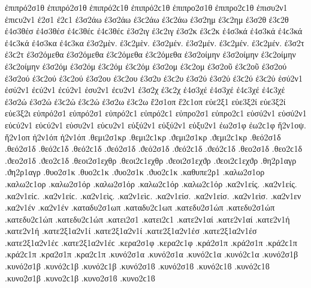 {ἐπιπρό2σ1θ ἐπιπρό2σ1θ ἐπιπρό2ϲ1θ ἐπιπρό2ϲ1θ   %
ἐπιπρο2σ1θ ἐπιπρο2ϲ1θ
ἐπισυ2ν1 ἐπιϲυ2ν1   %
ἐ2σ1 ἐ2ϲ1
ἐ3σ2άω ἐ3σ2άω ἐ3ϲ2άω ἐ3ϲ2άω   %
ἐ3σ2ημ ἐ3ϲ2ημ   %
ἐ3σ2θ ἐ3ϲ2θ   %
ἐ4σ3θέσ ἐ4σ3θέσ ἐ4ϲ3θέϲ ἐ4ϲ3θέϲ   %
ἐ3σ2ιγ ἐ3ϲ2ιγ   %
ἐ3σ2κ ἐ3ϲ2κ
ἐ4σ3κά ἐ4σ3κά ἐ4ϲ3κά ἐ4ϲ3κά   %
ἐ4σ3κα ἐ4ϲ3κα   %
%
ἐ3σ2μὲν. ἐ3ϲ2μὲν. ἐ3σ2μέν. ἐ3σ2μέν. ἐ3ϲ2μέν. ἐ3ϲ2μέν.   %
ἐ3σ2τ ἐ3ϲ2τ
ἐ3σ2όμεθα ἐ3σ2όμεθα ἐ3ϲ2όμεθα ἐ3ϲ2όμεθα
ἐ3σ2οίμην ἐ3σ2οίμην ἐ3ϲ2οίμην ἐ3ϲ2οίμην
ἐ3σ2όμ ἐ3σ2όμ ἐ3ϲ2όμ ἐ3ϲ2όμ   %
ἐ3σ2ομ ἐ3ϲ2ομ
ἐ3σ2οῦ ἐ3ϲ2οῦ   %
ἐ3σ2ού ἐ3σ2ού ἐ3ϲ2ού ἐ3ϲ2ού   %
ἐ3σ2ου ἐ3ϲ2ου   %
%
ἐ3σ2υ ἐ3ϲ2υ   %
ἐ3σ2ύ ἐ3σ2ύ ἐ3ϲ2ύ ἐ3ϲ2ύ
ἐσύ2ν1 ἐσύ2ν1 ἐϲύ2ν1 ἐϲύ2ν1   %
ἐσυ2ν1 ἐϲυ2ν1
ἐ3σ2χ ἐ3ϲ2χ
ἐ4σ3χέ ἐ4σ3χέ ἐ4ϲ3χέ ἐ4ϲ3χέ   %
ἐ3σ2ώ ἐ3σ2ώ ἐ3ϲ2ώ ἐ3ϲ2ώ
ἐ3σ2ω ἐ3ϲ2ω
ἔ2σ1οπ ἔ2ϲ1οπ   %
εὐε2ξ1   %
εὐε3ξ2ί εὐε3ξ2ί   %
εὐε3ξ2ι
εὐπρό2σ1 εὐπρό2σ1 εὐπρό2ϲ1 εὐπρό2ϲ1   %
εὐπρο2σ1 εὐπρο2ϲ1
εὐσύ2ν1 εὐσύ2ν1 εὐϲύ2ν1 εὐϲύ2ν1   %
εὐσυ2ν1 εὐϲυ2ν1
εὐξύ2ν1 εὐξύ2ν1   %
εὐξυ2ν1
ἐω2σ1φ ἐω2ϲ1φ   %
ἤ2ν1οψ.   %
ἤ2ν1οπ
ἠ2ν1όπ ἠ2ν1όπ
.θεμι2σ1κρ .θεμι2ϲ1κρ .ϑεμι2σ1κρ .ϑεμι2ϲ1κρ %
.θεό2σ1δ .θεό2σ1δ .θεό2ϲ1δ .θεό2ϲ1δ .ϑεό2σ1δ .ϑεό2σ1δ .ϑεό2ϲ1δ .ϑεό2ϲ1δ %
.θεο2σ1δ .θεο2ϲ1δ .ϑεο2σ1δ .ϑεο2ϲ1δ
.θεοι2σ1εχθρ .θεοι2ϲ1εχθρ .ϑεοι2σ1εχϑρ .ϑεοι2ϲ1εχϑρ %
.θη2ρ1αγρ .ϑη2ρ1αγρ %
.θυο2σ1κ .θυο2ϲ1κ .ϑυο2σ1κ .ϑυο2ϲ1κ %
.καθυπε2ρ1   %
.καλω2σ1ορ .καλω2ϲ1ορ   %
.καλω2σ1όρ .καλω2σ1όρ .καλω2ϲ1όρ .καλω2ϲ1όρ
.κα2ν1είς. .κα2ν1είς. .κα2ν1είϲ. .κα2ν1είϲ.   %
.κα2ν1εὶς. .κα2ν1εὶϲ.
.κα2ν1είσ. .κα2ν1είσ.
.κα2ν1εὶσ.
.κα2ν1εν
.κα2ν1έν .κα2ν1έν
.καταδυ2σ1ωπ .καταδυ2ϲ1ωπ   %
.κατεδυ2σ1ώπ .κατεδυ2σ1ώπ .κατεδυ2ϲ1ώπ .κατεδυ2ϲ1ώπ   %
.κατει2σ1 .κατει2ϲ1   %
.κατε2ν1αί .κατε2ν1αί   %
.κατε2ν1ή .κατε2ν1ή   %
.κατε2ξ1α2ν1ί .κατε2ξ1α2ν1ί   %
.κατε2ξ1α2ν1έσ .κατε2ξ1α2ν1έσ .κατε2ξ1α2ν1έϲ .κατε2ξ1α2ν1έϲ   %
.κερα2σ1φ .κερα2ϲ1φ   %
.κρά2σ1π .κρά2σ1π .κρά2ϲ1π .κρά2ϲ1π   %
.κρα2σ1π .κρα2ϲ1π
.κυνό2σ1α .κυνό2σ1α .κυνό2ϲ1α .κυνό2ϲ1α   %
.κυνό2σ1β .κυνό2σ1β .κυνό2ϲ1β .κυνό2ϲ1β .κυνό2σ1ϐ .κυνό2σ1ϐ .κυνό2ϲ1ϐ .κυνό2ϲ1ϐ %
.κυνο2σ1β .κυνο2ϲ1β .κυνο2σ1ϐ .κυνο2ϲ1ϐ
}
